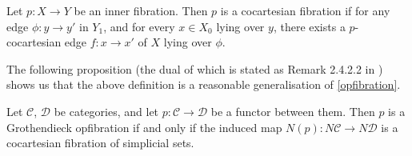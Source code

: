 \documentclass{MetricNotes2023}
\begin{document}
\begin{definition}
Let \(p : X \to Y\) be an inner fibration. Then \(p\) is a cocartesian fibration if for any edge \(\phi : y \to y'\) in \(Y_1\), and for every \(x \in X_0\) lying over \(y\), there exists a \(p\)-cocartesian edge \(f : x \to x'\) of \(X\) lying over \(\phi\). 
\end{definition}

The following proposition (the dual of which is stated as Remark 2.4.2.2 in \autocite{lurie2008higher}) shows us that the above definition is a reasonable generalisation of \ref{opfibration}. 

\begin{proposition}\label{prop:opiffco}
Let \(\mathcal{C}\), \(\mathcal{D}\) be categories, and let \(p : \mathcal{C} \to \mathcal{D}\) be a functor between them. Then \(p\) is a Grothendieck opfibration if and only if the induced map \(N(p) : N \mathcal{C} \to N\mathcal{D}\) is a cocartesian fibration of simplicial sets.
\end{proposition}
\end{document}
